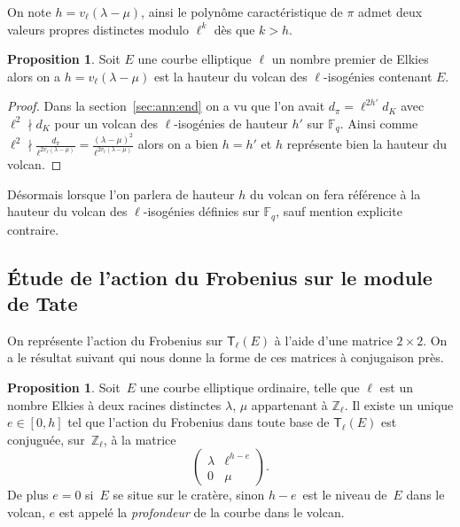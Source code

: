 \documentclass[10pt,a4paper]{book}
\theoremstyle{plain}
\theoremstyle{definition}
\theoremstyle{definition}
\theoremstyle{definition}
\theoremstyle{definition}
\newtheorem{prop}[thm]{Proposition}
\theoremstyle{definition}
\theoremstyle{remark}
\theoremstyle{remark}
\theoremstyle{definition}
\begin{document}
On note $h=v_{\ell}(\lambda - \mu)$, ainsi le polynôme caractéristique de 
$\pi$ admet deux valeurs propres distinctes modulo $\ell^k$ dès que $k > h$.

\begin{prop}
\label{pro:hau:vol}
Soit $E$ une courbe elliptique $\ell$ un nombre premier de Elkies alors on a 
$h=v_{\ell}(\lambda - \mu)$ est la hauteur du volcan des $\ell$-isogénies 
contenant $E$.
\end{prop}

\begin{proof}
Dans la section~\ref{sec:ann:end} on a vu que l'on avait $d_{\pi}=\ell^{2h'}d_K$ 
avec $\ell^2 \nmid d_K$ pour un volcan des $\ell$-isogénies de hauteur $h'$ sur 
$\mathbb{F}_q$. Ainsi comme $\ell^{2} \nmid  \frac{d_\pi}{\ell^{2 v_{\ell}
(\lambda - \mu)}}=\frac{(\lambda - \mu)^2}{\ell^{2 v_{\ell}(\lambda - \mu)}}$ 
alors on a bien $h=h'$ et $h$ représente bien la hauteur du volcan. 
\end{proof}
 
Désormais lorsque l'on parlera de hauteur $h$ du volcan on fera référence à la
hauteur du volcan des $\ell$-isogénies définies sur $\mathbb{F}_q$, sauf mention 
 explicite contraire.
\subsection{\'Etude de l'action du Frobenius sur le module de Tate}
\label{subs:elk:dir}

On représente l'action du Frobenius sur $\mathsf{T}_{\ell}(E)$ à l'aide d'une matrice $
2 \times 2$. On a le résultat suivant qui nous donne la forme de ces matrices à
conjugaison près.


\begin{prop}\label{pro:mat:fro}
Soit~$E$ une courbe elliptique ordinaire, telle que $\ell$ est un nombre Elkies
à deux racines distinctes $\lambda$, $\mu$ appartenant à $\mathbb{Z}_{\ell}$.
Il existe un unique $e \in [ 0, h]$ tel que 
l'action du Frobenius dans toute base de $\mathsf{T}_{\ell}(E)$  
est conjuguée, sur~$\mathbb{Z}_{\ell}$,
à la matrice 
\begin{equation*}
\left ( \begin{matrix}\lambda & \ell^{h-e} \\ 0 & \mu
\end{matrix}\right ).
\end{equation*}
De plus $e = 0$ si~$E$ se situe sur le cratère,
sinon $h - e$~est le niveau de~$E$ dans le volcan, $e$ est appelé la \emph{profondeur}
de la courbe dans le volcan.
\end{prop}
\end{document}
